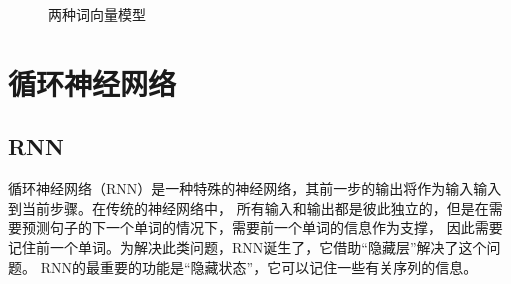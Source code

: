 \begin{figure}[htbp]
  \caption{两种词向量模型\cite{mikolov2013distributed}}
  \end{figure}

\section{循环神经网络}

\subsection{RNN}

循环神经网络（RNN）是一种特殊的神经网络，其前一步的输出将作为输入输入到当前步骤\cite{zaremba2014recurrent}。在传统的神经网络中，
所有输入和输出都是彼此独立的，但是在需要预测句子的下一个单词的情况下，需要前一个单词的信息作为支撑，
因此需要记住前一个单词。为解决此类问题，RNN诞生了，它借助“隐藏层”解决了这个问题。
RNN的最重要的功能是“隐藏状态”，它可以记住一些有关序列的信息。

